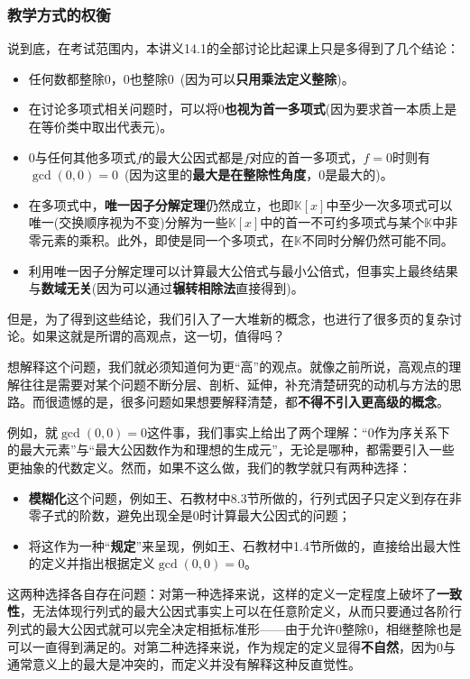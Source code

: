 \documentclass[a4paper,UTF8,fontset=windows,AutoFakeBold]{ctexart}
\begin{document}
\subsubsection{教学方式的权衡}
说到底，在考试范围内，本讲义14.1的全部讨论比起课上只是多得到了几个结论：
\begin{itemize}
    \item 任何数都整除0，0也整除0\ (因为可以\textbf{只用乘法定义整除})。
    \item 在讨论多项式相关问题时，可以将0\textbf{也视为首一多项式}(因为要求首一本质上是在等价类中取出代表元)。
    \item 0与任何其他多项式$f$的最大公因式都是$f$对应的首一多项式，$f=0$时则有$\gcd(0,0)=0$\ (因为这里的\textbf{最大是在整除性角度}，0是最大的)。
    \item 在多项式中，\textbf{唯一因子分解定理}仍然成立，也即$\mathbb{K}[x]$中至少一次多项式可以唯一(交换顺序视为不变)分解为一些$\mathbb{K}[x]$中的首一不可约多项式与某个$\mathbb{K}$中非零元素的乘积。此外，即使是同一个多项式，在$\mathbb{K}$不同时分解仍然可能不同。
    \item 利用唯一因子分解定理可以计算最大公倍式与最小公倍式，但事实上最终结果与\textbf{数域无关}(因为可以通过\textbf{辗转相除法}直接得到)。
\end{itemize}
但是，为了得到这些结论，我们引入了一大堆新的概念，也进行了很多页的复杂讨论。如果这就是所谓的高观点，这一切，值得吗？

想解释这个问题，我们就必须知道何为更``高''的观点。就像之前所说，高观点的理解往往是需要对某个问题不断分层、剖析、延伸，补充清楚研究的动机与方法的思路。而很遗憾的是，很多问题如果想要解释清楚，都\textbf{不得不引入更高级的概念}。

例如，就$\gcd(0,0)=0$这件事，我们事实上给出了两个理解：``0作为序关系下的最大元素''与``最大公因数作为和理想的生成元''，无论是哪种，都需要引入一些更抽象的代数定义。然而，如果不这么做，我们的教学就只有两种选择：
\begin{itemize}
    \item \textbf{模糊化}这个问题，例如王、石教材中8.3节所做的，行列式因子只定义到存在非零子式的阶数，避免出现全是0时计算最大公因式的问题；
    \item 将这作为一种``\textbf{规定}''来呈现，例如王、石教材中1.4节所做的，直接给出最大性的定义并指出根据定义$\gcd(0,0)=0$。
\end{itemize}
这两种选择各自存在问题：对第一种选择来说，这样的定义一定程度上破坏了\textbf{一致性}，无法体现行列式的最大公因式事实上可以在任意阶定义，从而只要通过各阶行列式的最大公因式就可以完全决定相抵标准形——由于允许0整除0，相继整除也是可以一直得到满足的。对第二种选择来说，作为规定的定义显得\textbf{不自然}，因为0与通常意义上的最大是冲突的，而定义并没有解释这种反直觉性。
\end{document}
